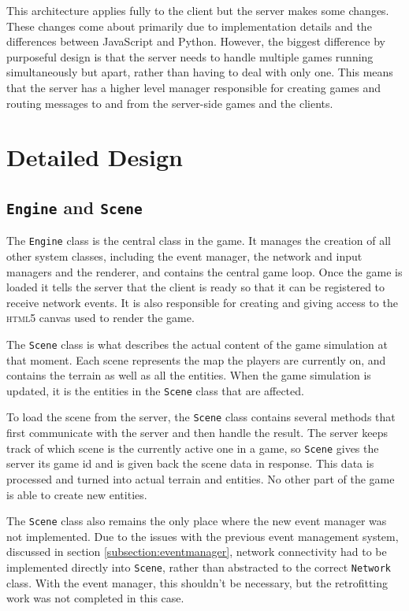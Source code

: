 This architecture applies fully to the client but the server makes some changes. These changes come about primarily due to implementation details and the differences between JavaScript and Python. However, the biggest difference by purposeful design is that the server needs to handle multiple games running simultaneously but apart, rather than having to deal with only one. This means that the server has a higher level manager responsible for creating games and routing messages to and from the server-side games and the clients.


\section{Detailed Design}

\subsection{\texttt{Engine} and \texttt{Scene}}
The \texttt{Engine} class is the central class in the game. It manages the creation of all other system classes, including the event manager, the network and input managers and the renderer, and contains the central game loop. Once the game is loaded it tells the server that the client is ready so that it can be registered to receive network events. It is also responsible for creating and giving access to the \textsc{html5} canvas used to render the game.

The \texttt{Scene} class is what describes the actual content of the game simulation at that moment. Each scene represents the map the players are currently on, and contains the terrain as well as all the entities. When the game simulation is updated, it is the entities in the \texttt{Scene} class that are affected.

To load the scene from the server, the \texttt{Scene} class contains several methods that first communicate with the server and then handle the result. The server keeps track of which scene is the currently active one in a game, so \texttt{Scene} gives the server its game id and is given back the scene data in response. This data is processed and turned into actual terrain and entities. No other part of the game is able to create new entities.

The \texttt{Scene} class also remains the only place where the new event manager was not implemented. Due to the issues with the previous event management system, discussed in section \ref{subsection:eventmanager}, network connectivity had to be implemented directly into \texttt{Scene}, rather than abstracted to the correct \texttt{Network} class. With the event manager, this shouldn't be necessary, but the retrofitting work was not completed in this case.

